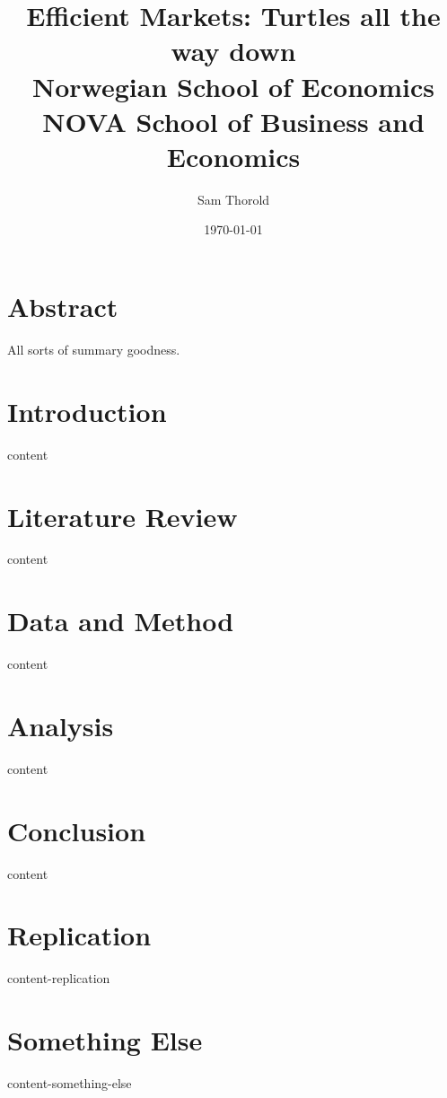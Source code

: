 \documentclass[a4paper, 12pt]{report}
\title{
  {Efficient Markets: Turtles all the way down}\\
  {\large Norwegian School of Economics}\\
  {\large NOVA School of Business and Economics}
}
\author{Sam Thorold}
\date{\today}
\begin{document}
\maketitle

\chapter*{Abstract}

All sorts of summary goodness.

\tableofcontents

\chapter{Introduction} \label{ch:Intro}
{content}

\chapter{Literature Review} \label{ch:LitRev}
{content}

\chapter{Data and Method} \label{ch:DataMethod}
{content}

\chapter{Analysis} \label{ch:Analysis}
{content}

\chapter{Conclusion} \label{ch:Conclusion}
{content}

\appendix

\chapter{Replication} \label{ch:AppendixRepl}
{content-replication}

\chapter{Something Else} \label{ch:AppendixB}
{content-something-else}

\printbibliography
\end{document}
